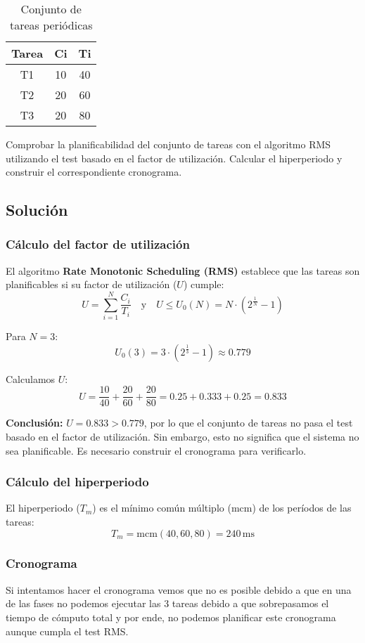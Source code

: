 \documentclass[a4paper,12pt]{article}
\begin{document}
\begin{table}[H]
\centering
\begin{tabular}{|c|c|c|}
\hline
\textbf{Tarea} & \textbf{Ci} & \textbf{Ti} \\ \hline
T1 & 10 & 40 \\ \hline
T2 & 20 & 60 \\ \hline
T3 & 20 & 80 \\ \hline
\end{tabular}
\caption{Conjunto de tareas periódicas}
\end{table}

Comprobar la planificabilidad del conjunto de tareas con el algoritmo RMS utilizando el test basado en el factor de utilización. Calcular el hiperperiodo y construir el correspondiente cronograma.

\subsection{Solución}
\subsubsection{Cálculo del factor de utilización}
El algoritmo \textbf{Rate Monotonic Scheduling (RMS)} establece que las tareas son planificables si su factor de utilización (\(U\)) cumple:
\[
U = \sum_{i=1}^{N} \frac{C_i}{T_i} \quad \text{y} \quad U \leq U_0(N) = N \cdot (2^{\frac{1}{N}} - 1)
\]

Para \(N = 3\):
\[
U_0(3) = 3 \cdot (2^{\frac{1}{3}} - 1) \approx 0.779
\]

Calculamos \(U\):
\[
U = \frac{10}{40} + \frac{20}{60} + \frac{20}{80} = 0.25 + 0.333 + 0.25 = 0.833
\]

\textbf{Conclusión:} \(U = 0.833 > 0.779\), por lo que el conjunto de tareas no pasa el test basado en el factor de utilización. Sin embargo, esto no significa que el sistema no sea planificable. Es necesario construir el cronograma para verificarlo.

\subsubsection{Cálculo del hiperperiodo}
El hiperperiodo (\(T_m\)) es el mínimo común múltiplo (\(\text{mcm}\)) de los períodos de las tareas:
\[
T_m = \text{mcm}(40, 60, 80) = 240 \, \text{ms}
\]

\subsubsection{Cronograma}
Si intentamos hacer el cronograma vemos que no es posible debido a que en una de las fases no podemos ejecutar las 3 tareas debido a que sobrepasamos el tiempo de cómputo total y por ende, no podemos planificar este cronograma aunque cumpla el test RMS.
\end{document}
